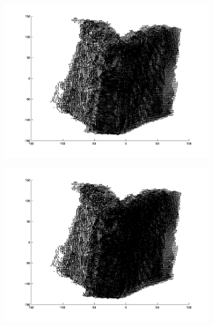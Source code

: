 \begin{figure}
	\begin{subfigure}[b]{0.3\textwidth}
		\centering
		\includegraphics[width=\textwidth]{Images/Book4.png}
		\caption{}
	\end{subfigure}%
	\begin{subfigure}[b]{0.3\textwidth}
		\centering
		\includegraphics[width=\textwidth]{Images/Book5.png}
		\caption{}
	\end{subfigure}
	\begin{subfigure}[b]{0.3\textwidth}
		\centering

\end{subfigure}
\end{figure}
